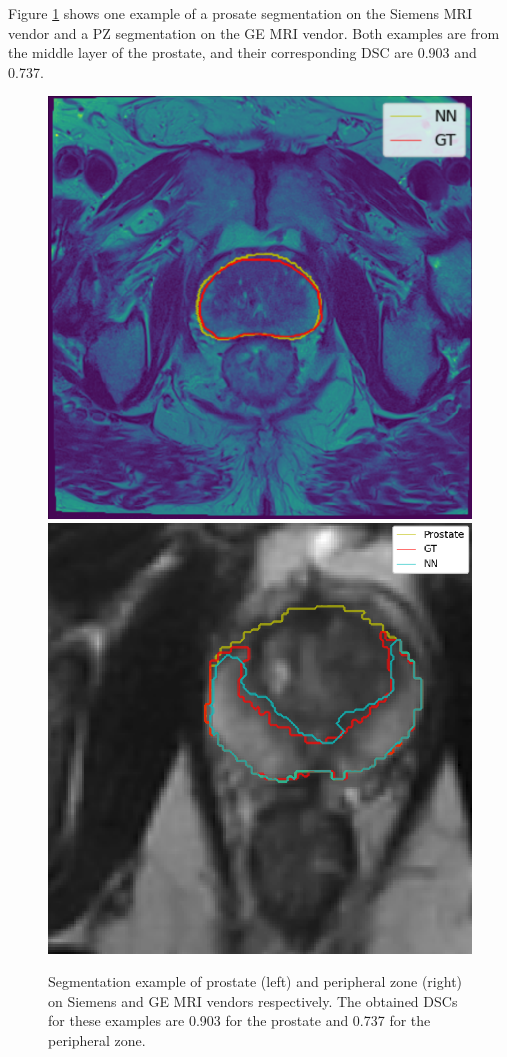 Figure \ref{fig:resseg} shows one example of a prosate segmentation on the
Siemens MRI vendor and a PZ segmentation on the GE MRI vendor. Both examples
are from the middle layer of the prostate, and their corresponding DSC are 0.903 and
0.737.
\begin{figure}[h]
    \centering
    \includegraphics[totalheight=.18\textheight]{imgs/results/prosate.png}
    \includegraphics[totalheight=.18\textheight]{imgs/results/pz.png}
    \caption{Segmentation example of prostate (left) and peripheral zone (right) on Siemens and GE
        MRI vendors respectively. The obtained DSCs for these examples are 0.903 for the prostate
        and 0.737 for the peripheral zone.}
    \label{fig:resseg}
\end{figure}

